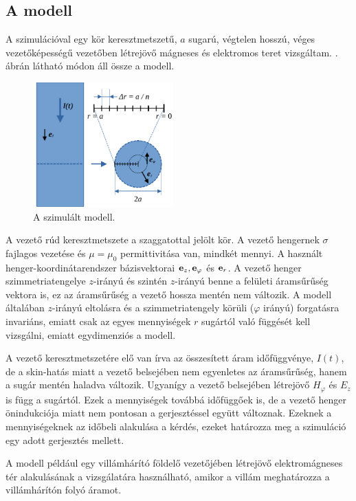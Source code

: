         \subsection{A modell}
            A szimulációval egy kör keresztmetszetű, $a$ sugarú, végtelen hosszú, véges vezetőképességű vezetőben létrejövő mágneses és elektromos teret vizsgáltam. . ábrán látható módon áll össze a modell. 
            \par
            \begin{figure}[h!]
                \centering
                \includegraphics[width=0.48\textwidth]{kep/modell.pdf}
                \caption{A szimulált modell.}
                \label{fig:modell}
            \end{figure}
             A vezető rúd keresztmetszete a szaggatottal jelölt kör. A vezető hengernek $\sigma$ fajlagos vezetése és $\mu=\mu_0$ permittivitása van, mindkét mennyi. A használt henger-koordinátarendszer bázisvektorai ${\bf e}_{z}, {\bf e}_{\varphi}$ és ${\bf e}_{r}$. A vezető henger szimmetriatengelye $z$-irányú és szintén $z$-irányú benne a felületi áramsűrűség vektora is, ez az áramsűrűség a vezető hossza mentén nem változik. A modell általában $z$-irányú eltolásra és a szimmetriatengely körüli ($\varphi$ irányú) forgatásra invariáns, emiatt csak az egyes mennyiségek $r$ sugártól való függését kell vizsgálni, emiatt egydimenziós a modell.
             \par
             A vezető keresztmetszetére elő van írva az összesített áram időfüggvénye, $I(t)$, de a skin-hatás miatt a vezető belsejében nem egyenletes az áramsűrűség, hanem a sugár mentén haladva változik. Ugyanígy a vezető belsejében létrejövő $H_\varphi$ és $E_z$ is függ a sugártól. Ezek a mennyiségek továbbá időfüggőek is, de a vezető henger önindukciója miatt nem pontosan a gerjesztéssel együtt változnak. Ezeknek a mennyiségeknek az időbeli alakulása a kérdés, ezeket határozza meg a szimuláció egy adott gerjesztés mellett.
            \par
            A modell például egy villámhárító földelő vezetőjében létrejövő elektromágneses tér alakulásának a vizsgálatára használható, amikor a villám meghatározza a villámhárítón folyó áramot.
